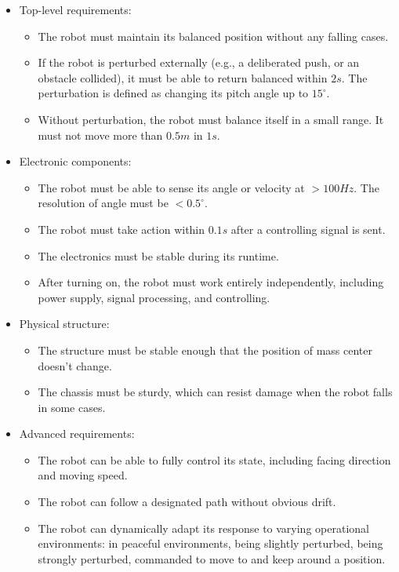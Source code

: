 \documentclass[9pt,a4paper,twocolumn]{tau-class/tau}
\begin{document}
\begin{itemize}
	\item Top-level requirements: \begin{itemize}
	\item The robot must maintain its balanced position without any falling cases.
	\item If the robot is perturbed externally (e.g., a deliberated push, or an obstacle collided), it must be able to return balanced within $2s$. The perturbation is defined as changing its pitch angle up to $15^\circ$.
	\item Without perturbation, the robot must balance itself in a small range. It must not move more than $0.5m$ in $1s$.
	\end{itemize}

	\item Electronic components:\begin{itemize}
	\item The robot must be able to sense its angle or velocity at $>100Hz$. The resolution of angle must be $<0.5^\circ$.
	\item The robot must take action within $0.1s$ after a controlling signal is sent.
	\item The electronics must be stable during its runtime.
	\item After turning on,  the robot must work entirely independently, including power supply, signal processing, and controlling.
	\end{itemize}

	\item Physical structure:\begin{itemize}
	\item The structure must be stable enough that the position of mass center doesn't change.
	\item The chassis must be sturdy, which can resist damage when the robot falls in some cases.
	\end{itemize}
  
  \item Advanced requirements: \begin{itemize}
  \item The robot can be able to fully control its state, including facing direction and moving speed.
  \item The robot can follow a designated path without obvious drift.
  \item The robot can dynamically adapt its response to varying operational environments: in peaceful environments, being slightly perturbed, being strongly perturbed, commanded to move to and keep around a position. 
  \end{itemize}
\end{itemize}
\end{document}
